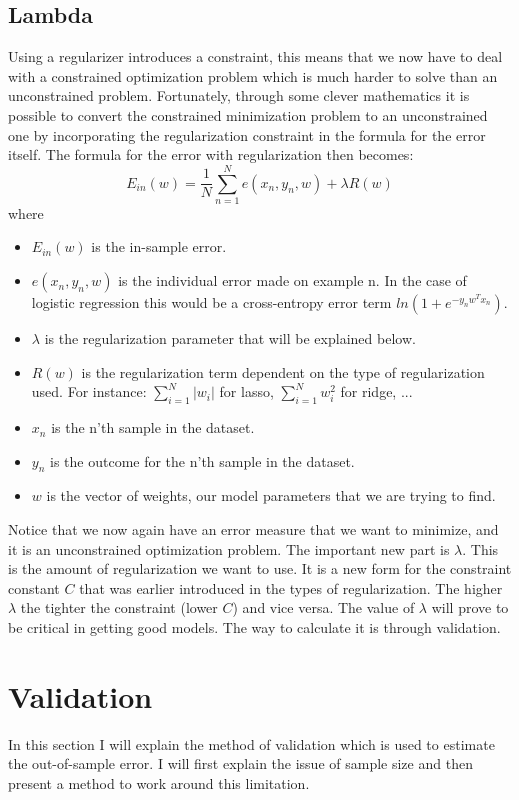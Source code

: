 \subsection{Lambda}
\label{subsec:glm-lambda}
Using a regularizer introduces a constraint, this means that we now have to deal with a constrained optimization problem which is much harder to solve than an unconstrained problem. Fortunately, through some clever mathematics it is possible to convert the constrained minimization problem to an unconstrained one by incorporating the regularization constraint in the formula for the error itself\cite{caltechmachinelearning}. The formula for the error with regularization then becomes:
$$
E_{in}(w) = \frac{1}{N}\sum_{n=1}^{N}e(x_{n},y_{n},w)+\lambda R(w)
$$
where
\begin{itemize}
	\item $E_{in}(w)$ is the in-sample error.
	\item $e(x_{n},y_{n},w)$ is the individual error made on example n. In the case of logistic regression this would be a cross-entropy error term $ln(1+e^{-y_{n}w^{T}x_{n}})$.
	\item $\lambda$ is the regularization parameter that will be explained below.
	\item $R(w)$ is the regularization term dependent on the type of regularization used. For instance: $\sum_{i=1}^{N}\lvert w_{i}\rvert$ for lasso, $\sum_{i=1}^{N}w_{i}^{2}$ for ridge, ...
	\item $x_{n}$ is the n'th sample in the dataset.
	\item $y_{n}$ is the outcome for the n'th sample in the dataset.
	\item $w$ is the vector of weights, our model parameters that we are trying to find.
\end{itemize}
Notice that we now again have an error measure that we want to minimize, and it is an unconstrained optimization problem. The important new part is $\lambda$. This is the amount of regularization we want to use. It is a new form for the constraint constant $C$ that was earlier introduced in the types of regularization. The higher $\lambda$ the tighter the constraint (lower $C$) and vice versa. The value of $\lambda$ will prove to be critical in getting good models. The way to calculate it is through validation.
\section{Validation}
\label{sec:glm-validation}
In this section I will explain the method of validation which is used to estimate the out-of-sample error. I will first explain the issue of sample size and then present a method to work around this limitation.
